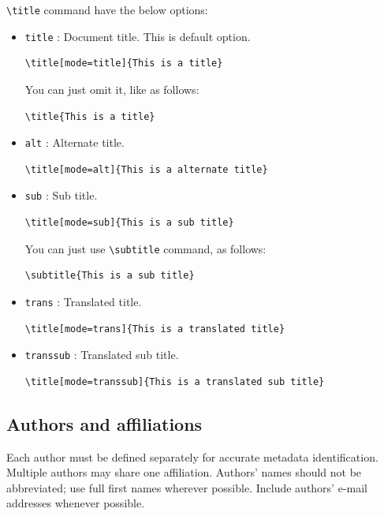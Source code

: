 \documentclass[%
]{ceurart}
\begin{document}
\verb|\title|
command have the below options:
\begin{itemize}
\item
\verb|title|
: Document title. This is default option.
\begin{lstlisting}[language={[latex]TeX}]
\title[mode=title]{This is a title}
\end{lstlisting}

You can just omit it, like as follows:
\begin{lstlisting}[language={[latex]TeX}]
\title{This is a title}
\end{lstlisting}

\item
\verb|alt|
: Alternate title.
\begin{lstlisting}[language={[latex]TeX}]
\title[mode=alt]{This is a alternate title}
\end{lstlisting}

\item
\verb|sub|
: Sub title.
\begin{lstlisting}[language={[latex]TeX}]
\title[mode=sub]{This is a sub title}
\end{lstlisting}
You can just use
\verb|\subtitle|
 command, as follows:
\begin{lstlisting}[language={[latex]TeX}]
\subtitle{This is a sub title}
\end{lstlisting}

\item
\verb|trans|
: Translated title.
\begin{lstlisting}[language={[latex]TeX}]
\title[mode=trans]{This is a translated title}
\end{lstlisting}

\item
\verb|transsub|
: Translated sub title.
\begin{lstlisting}[language={[latex]TeX}]
\title[mode=transsub]{This is a translated sub title}
\end{lstlisting}
\end{itemize}

\subsection{Authors and affiliations}

Each author must be defined separately for accurate metadata identification.
Multiple authors may share one affiliation.
Authors' names should not be abbreviated; use full first names wherever possible.
Include authors' e-mail addresses whenever possible.
\end{document}

